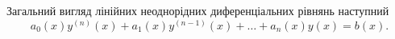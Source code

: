 Загальний вигляд лінійних неоднорідних диференціальних рівнянь наступний
\begin{equation*}
	a_0(x) y^{(n)}(x) + a_1(x) y^{(n - 1)}(x) + \ldots + a_n(x) y(x) = b(x).
\end{equation*}
